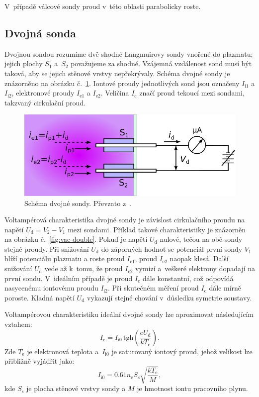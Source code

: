 \documentclass{protokol}
\newcommand\elemcharge{e}
\newcommand\boltzmann{k}
\newcommand{\tgh}{\mathrm{tgh}}
\newcommand\denselec{n_\mathrm{e}}
\newcommand\probesurf{S}
\newcommand\sheathsurf{S_\mathrm{s}}
\newcommand\tempelec{T_\mathrm{e}}
\newcommand\massion{M}
\newcommand\iioni{I_{\mathrm{i}1}}
\newcommand\iionii{I_{\mathrm{i}2}}
\newcommand\iionsat{I_{\mathrm{i}0}}
\newcommand\ieleci{I_{\mathrm{e}1}}
\newcommand\ielecii{I_{\mathrm{e}2}}
\newcommand\idouble{I_{\mathrm{c}}}
\newcommand\poti{V_1}
\newcommand\potii{V_2}
\newcommand\udouble{U_\mathrm{d}}
\begin{document}
V~případě válcové sondy proud v~této oblasti parabolicky roste.

\subsection{Dvojná sonda}
Dvojnou sondou rozumíme dvě shodné Langmuirovy sondy vnořené do plazmatu;
jejich plochy $\probesurf_1$ a~$\probesurf_2$ považujeme za shodné.
Vzájemná vzdálenost sond musí být taková, aby se jejich stěnové vrstvy
nepřekrývaly.
Schéma dvojné sondy je znázorněno na obrázku č.~\ref{fig:probe-double}.
Iontové proudy jednotlivých sond jsou označeny $\iioni$ a $\iionii$,
elektronové proudy $\ieleci$ a $\ielecii$.
Veličina $\idouble$ značí proud tekoucí mezi sondami,
takzvaný cirkulační proud.

\begin{figure}[hbp]
	\centering
	\includegraphics{probe-double}
	\caption{Schéma dvojné sondy.
		Převzato z~\autocite{assignment-doubleprobe}.}
	\label{fig:probe-double}
\end{figure}

Voltampérová charakteristika dvojné sondy je závislost cirkulačního proudu
na napětí $\udouble = \potii - \poti$ mezi sondami.
Příklad takové charakteristiky je znázorněn na obrázku č.~\ref{fig:vac-double}.
Pokud je napětí $\udouble$ nulové, tečou na obě sondy stejné proudy.
Při snižování $\udouble$ do záporných hodnot se potenciál první sondy $\poti$
blíží potenciálu plazmatu a roste proud $\ieleci$,
proud $\ielecii$ naopak klesá.
Další snižování $\udouble$ vede až k~tomu,
že proud $\ielecii$ vymizí a~veškeré elektrony dopadají na první sondu.
V~ideálním případě je proud $\idouble$ dále konstantní,
což odpovídá nasycenému iontovému proudu $\iionii$.
Při skutečném měření proud $\idouble$ dále mírně poroste.
Kladná napětí $\udouble$ vykazují stejné chování v~důsledku symetrie soustavy.

Voltampérovou charakteristiku ideální dvojné sondy lze aproximovat
následujícím vztahem:
\begin{equation}
	\label{eq:double-ideal}
	\idouble = \iionsat \, \tgh \left(
		\frac{\elemcharge\udouble}{\boltzmann\tempelec} \right).
\end{equation}
Zde $\tempelec$ je elektronová teplota
a~$\iionsat$ je saturovaný iontový proud, jehož velikost lze přibližně
vyjádřit jako:
\begin{equation}
	\label{eq:double-iionsat}
	\iionsat = \num{0.61} \denselec \sheathsurf
		\sqrt{\frac{\boltzmann\tempelec}{\massion}},
\end{equation}
kde $\sheathsurf$ je plocha stěnové vrstvy sondy
a $\massion$ je hmotnost iontu pracovního plynu.
\end{document}

